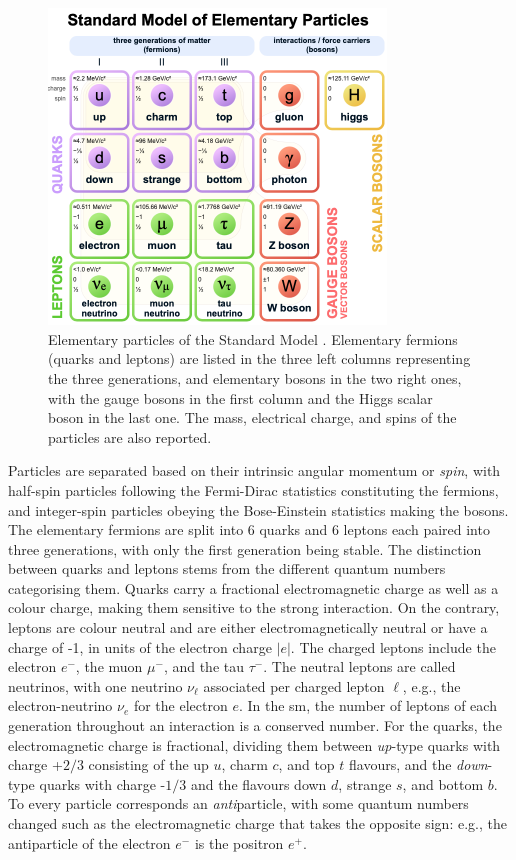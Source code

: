 \begin{figure}[!h]
    \centering
    \includegraphics[width=0.8\textwidth]{Images/Theory/SMpart.png}
    \caption[Particles in the SM]{Elementary particles of the Standard Model \cite{tableSMWiki}. Elementary fermions (quarks and leptons) are listed in the three left columns representing the three generations, and elementary bosons in the two right ones, with the gauge bosons in the first column and the Higgs scalar boson in the last one. The mass, electrical charge, and spins of the particles are also reported.}
    \label{particlesSM}
\end{figure}

Particles are separated based on their intrinsic angular momentum or \textit{spin}, with half-spin particles following the Fermi-Dirac statistics constituting the fermions, and integer-spin particles obeying the Bose-Einstein statistics making the bosons. The elementary fermions are split into 6 quarks and 6 leptons each paired into three generations, with only the first generation being stable. The distinction between quarks and leptons stems from the different quantum numbers categorising them. Quarks carry a fractional electromagnetic charge as well as a colour charge, making them sensitive to the strong interaction. On the contrary, leptons are colour neutral and are either electromagnetically neutral or have a charge of -1, in units of the electron charge $|e|$. The charged leptons include the electron $e^-$, the muon $\mu^-$, and the tau $\tau^-$. The neutral leptons are called neutrinos, with one neutrino $\nu_\ell$ associated per charged lepton $\ell$, e.g., the electron-neutrino $\nu_e$ for the electron $e$. In the \gls{sm}, the number of leptons of each generation throughout an interaction is a conserved number. For the quarks, the electromagnetic charge is fractional, dividing them between \textit{up}-type quarks with charge +$2/3$ consisting of the up $u$, charm $c$, and top $t$ flavours, and the \textit{down}-type quarks with charge -$1/3$ and the flavours down $d$, strange $s$, and bottom $b$. To every particle corresponds an \textit{anti}particle, with some quantum numbers changed such as the electromagnetic charge that takes the opposite sign: e.g., the antiparticle of the electron $e^-$ is the positron $e^+$. \\

